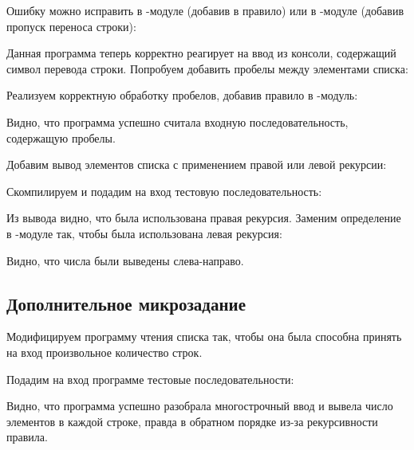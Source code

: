 Ошибку можно исправить в -модуле (добавив  в правило) или в -модуле (добавив пропуск переноса строки):



Данная программа теперь корректно реагирует на ввод из консоли, содержащий символ перевода строки. Попробуем добавить пробелы между элементами списка:


Реализуем корректную обработку пробелов, добавив правило в -модуль:



Видно, что программа успешно считала входную последовательность, содержащую пробелы.

Добавим вывод элементов списка с применением правой или левой рекурсии:



Скомпилируем и подадим на вход тестовую последовательность:


Из вывода видно, что была использована правая рекурсия. Заменим определение в -модуле так, чтобы была использована левая рекурсия:



Видно, что числа были выведены слева-направо.

\subsection{Дополнительное микрозадание}

Модифицируем программу чтения списка так, чтобы она была способна принять на вход произвольное количество строк.



Подадим на вход программе тестовые последовательности:



Видно, что программа успешно разобрала многострочный ввод и вывела число элементов в каждой строке, правда в обратном порядке из-за рекурсивности правила.

